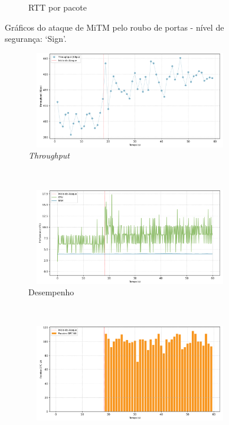 \begin{apendicesenv}
\begin{figure}[htbp!]
\begin{subfigure}[t]{0.5\textwidth}
        \caption{RTT por pacote}
    \end{subfigure}%
    \label{fig:1-mitm_port}
    \caption{Gráficos do ataque de MiTM pelo roubo de portas - nível de segurança: `Sign'.}
\end{figure}

\begin{figure}[htbp!]
    \centering
    \begin{subfigure}[t]{0.5\textwidth}
        \centering
        \includegraphics[width=1\textwidth, height=120pt]{USPSC-img/output/cropped/2-mitm_port-tput.png}
        \caption{\textit{Throughput}}
    \end{subfigure}%
    ~ 
    \begin{subfigure}[t]{0.5\textwidth}
        \centering
        \includegraphics[width=1\textwidth, height=120pt]{USPSC-img/output/cropped/2-mitm_port-perf.png}
        \caption{Desempenho}
    \end{subfigure}%
    \\
    \begin{subfigure}[t]{0.5\textwidth}
        \centering
        \includegraphics[width=1\textwidth, height=120pt]{USPSC-img/output/cropped/2-mitm_port-pack.png}

\end{subfigure}
\end{figure}
\end{apendicesenv}
